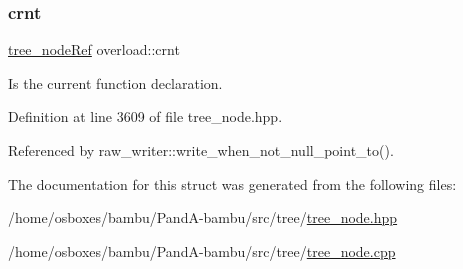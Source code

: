 \subsubsection{\texorpdfstring{crnt}{crnt}}
{\footnotesize\ttfamily \hyperlink{tree__node_8hpp_a6ee377554d1c4871ad66a337eaa67fd5}{tree\+\_\+node\+Ref} overload\+::crnt}



Is the current function declaration. 



Definition at line 3609 of file tree\+\_\+node.\+hpp.



Referenced by raw\+\_\+writer\+::write\+\_\+when\+\_\+not\+\_\+null\+\_\+point\+\_\+to().



The documentation for this struct was generated from the following files\+:\begin{DoxyCompactItemize}
\item 
/home/osboxes/bambu/\+Pand\+A-\/bambu/src/tree/\hyperlink{tree__node_8hpp}{tree\+\_\+node.\+hpp}\item 
/home/osboxes/bambu/\+Pand\+A-\/bambu/src/tree/\hyperlink{tree__node_8cpp}{tree\+\_\+node.\+cpp}\end{DoxyCompactItemize}
